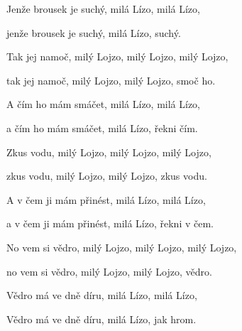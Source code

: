 \zs
Jenže brousek je suchý, milá Lízo, milá Lízo,

jenže brousek je suchý, milá Lízo, suchý.
\ks

\zs
Tak jej namoč, milý Lojzo, milý Lojzo, milý Lojzo,

tak jej namoč, milý Lojzo, milý Lojzo, smoč ho.
\ks

\zs
A čím ho mám smáčet, milá Lízo, milá Lízo,

a čím ho mám smáčet, milá Lízo, řekni čím.
\ks

\zs
Zkus vodu, milý Lojzo, milý Lojzo, milý Lojzo,

zkus vodu, milý Lojzo, milý Lojzo, zkus vodu.
\ks

\zs
A v čem ji mám přinést, milá Lízo, milá Lízo,

a v čem ji mám přinést, milá Lízo, řekni v čem.
\ks

\zs
No vem si vědro, milý Lojzo, milý Lojzo, milý Lojzo,

no vem si vědro, milý Lojzo, milý Lojzo, vědro.
\ks

\zs
Vědro má ve dně díru, milá Lízo, milá Lízo,

Vědro má ve dně díru, milá Lízo, jak hrom.
\ks

\kp




















